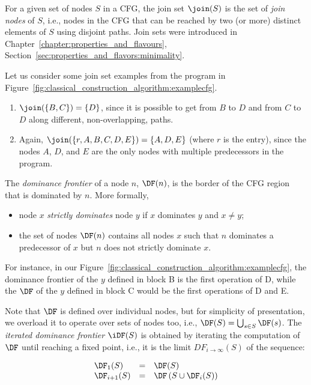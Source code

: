 {For a given set of nodes $S$ in a CFG, the join set $\join(S)$ is the set of \textit{join nodes} of $S$, i.e., nodes in the CFG that can be reached by two (or more) distinct elements of $S$ using disjoint paths. 
Join sets were introduced in Chapter~\ref{chapter:properties_and_flavours}, Section~\ref{sec:properties_and_flavors:minimality}.

Let us consider some join set examples from the program in Figure~\ref{fig:classical_construction_algorithm:examplecfg}.
\begin{enumerate}
\item $\join(\{B,C\}) = \{D\}$, since it is possible to get from $B$ to $D$ and from $C$ to $D$ along different, non-overlapping, paths.
\item Again, $\join(\{r, A, B, C, D, E \}) = \{A,D,E\}$ (where $r$ is the entry), since the nodes $A$, $D$, and $E$ are the only nodes with multiple predecessors in the program.
\end{enumerate}


The \textit{dominance frontier} of a node $n$, $\DF(n)$, is the border of the CFG region that is dominated by $n$. 
More formally,
\begin{itemize}
\item node $x$ \textit{strictly dominates} node $y$ if $x$ dominates $y$ and $x \neq y$;
\item the set of nodes $\DF(n)$ contains all nodes $x$ such that $n$ dominates a predecessor of $x$ but $n$ does not strictly dominate $x$.
\end{itemize}

For instance, in our Figure~\ref{fig:classical_construction_algorithm:examplecfg}, the dominance frontier of the $y$ defined in block B is the first operation of D, while the $\DF$ of the $y$ defined in block C would be the first operations of D and E.


Note that $\DF$ is defined over individual nodes, but for simplicity of presentation, we overload it to operate over sets of nodes too, i.e., $\DF(S) = \bigcup_{s\in S} \DF(s)$. 
The \textit{iterated dominance frontier} $\iDF(S)$ is obtained by iterating the computation of $\DF$ until reaching a fixed point, i.e., it is the limit $DF_{i\rightarrow\infty}(S)$ of the sequence:

$$\begin{array}{lll}
\DF_1(S) & = & \DF(S)\\
\DF_{i+1}(S) & = & \DF\left(S\cup \DF_i(S)\right)
\end{array}
$$


}
